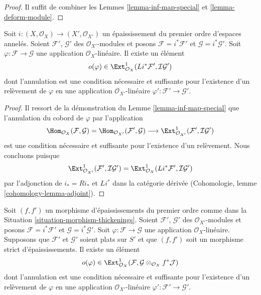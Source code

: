 \begin{proof}
Il suffit de combiner les Lemmes \ref{lemma-inf-map-special} et
\ref{lemma-deform-module}.
\end{proof}

\begin{lemma}
\label{lemma-inf-obs-map-special}
Soit $i : (X, \mathcal{O}_X) \to (X', \mathcal{O}_{X'})$
un épaississement du premier ordre d'espaces annelés.
Soient $\mathcal{F}'$, $\mathcal{G}'$ des $\mathcal{O}_{X'}$-modules et posons
$\mathcal{F} = i^*\mathcal{F}'$ et $\mathcal{G} = i^*\mathcal{G}'$.
Soit $\varphi : \mathcal{F} \to \mathcal{G}$ une application
$\mathcal{O}_X$-linéaire.
Il existe un élément
$$
o(\varphi) \in
\Ext^1_{\mathcal{O}_X}(Li^*\mathcal{F}',
\mathcal{I}\mathcal{G}')
$$
dont l'annulation est une condition nécessaire et suffisante pour
l'existence d'un relèvement de $\varphi$ en une application
$\mathcal{O}_{X'}$-linéaire
$\varphi' : \mathcal{F}' \to \mathcal{G}'$.
\end{lemma}

\begin{proof}
Il ressort de la démonstration du Lemme \ref{lemma-inf-map-special} que
l'annulation du cobord de $\varphi$ par l'application
$$
\Hom_{\mathcal{O}_X}(\mathcal{F}, \mathcal{G}) =
\Hom_{\mathcal{O}_{X'}}(\mathcal{F}', \mathcal{G}) \longrightarrow
\Ext^1_{\mathcal{O}_{X'}}(\mathcal{F}', \mathcal{I}\mathcal{G}')
$$
est une condition nécessaire et suffisante pour l'existence d'un relèvement. Nous
concluons puisque
$$
\Ext^1_{\mathcal{O}_{X'}}(\mathcal{F}', \mathcal{I}\mathcal{G}') =
\Ext^1_{\mathcal{O}_X}(Li^*\mathcal{F}', \mathcal{I}\mathcal{G}')
$$
par l'adjonction de $i_* = Ri_*$ et $Li^*$ dans la catégorie dérivée
(Cohomologie, lemme \ref{cohomology-lemma-adjoint}).
\end{proof}

\begin{lemma}
\label{lemma-inf-obs-map-rel}
Soit $(f, f')$ un morphisme d'épaississements du
premier ordre comme dans la Situation \ref{situation-morphism-thickenings}.
Soient $\mathcal{F}'$, $\mathcal{G}'$ des $\mathcal{O}_{X'}$-modules et posons
$\mathcal{F} = i^*\mathcal{F}'$ et $\mathcal{G} = i^*\mathcal{G}'$.
Soit $\varphi : \mathcal{F} \to \mathcal{G}$ une application
$\mathcal{O}_X$-linéaire.
Supposons que $\mathcal{F}'$ et $\mathcal{G}'$ soient plats sur $S'$ et
que $(f, f')$ soit un morphisme strict d'épaississements. Il existe un élément
$$
o(\varphi) \in  \Ext^1_{\mathcal{O}_X}(\mathcal{F},
\mathcal{G} \otimes_{\mathcal{O}_X} f^*\mathcal{J})
$$
dont l'annulation est une condition nécessaire et suffisante pour
l'existence d'un relèvement de $\varphi$ en une application
$\mathcal{O}_{X'}$-linéaire
$\varphi' : \mathcal{F}' \to \mathcal{G}'$.
\end{lemma}

